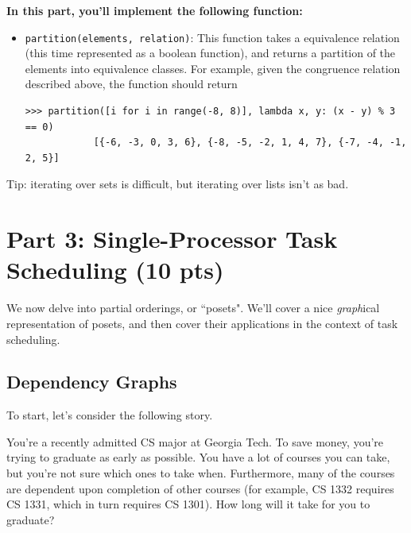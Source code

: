 \documentclass{article}
\begin{document}
    \vspace{3mm}
    \begin{tcolorbox}[colback=yellow!30]
        \textbf{In this part, you'll implement the following function:}
        \begin{itemize}
            \item \lstinline{partition(elements, relation)}: This function takes a equivalence relation (this time represented as a boolean function), and returns a partition of the elements into equivalence classes. For example, given the congruence relation described above, the function should return
        \begin{lstlisting}[belowskip=-10pt]
            >>> partition([i for i in range(-8, 8)], lambda x, y: (x - y) % 3 == 0)
            [{-6, -3, 0, 3, 6}, {-8, -5, -2, 1, 4, 7}, {-7, -4, -1, 2, 5}]
        \end{lstlisting}
        \end{itemize}
        Tip: iterating over sets is difficult, but iterating over lists isn't as bad.
    \end{tcolorbox}


\section*{Part 3: Single-Processor Task Scheduling (10 pts)}

    We now delve into partial orderings, or ``posets". We'll cover a nice \textit{graph}ical representation of posets, and then cover their applications in the context of task scheduling. 
    
    \subsection*{Dependency Graphs}
    To start, let's consider the following story. 

    \begin{tcolorbox}[colback=red!20]
        You're a recently admitted CS major at Georgia Tech. To save money, you're trying to graduate as early as possible.  You have a lot of courses you can take, but you're not sure which ones to take when. Furthermore, many of the courses are dependent upon completion of other courses (for example, CS 1332 requires CS 1331, which in turn requires CS 1301). How long will it take for you to graduate?
    \end{tcolorbox}
\end{document}
